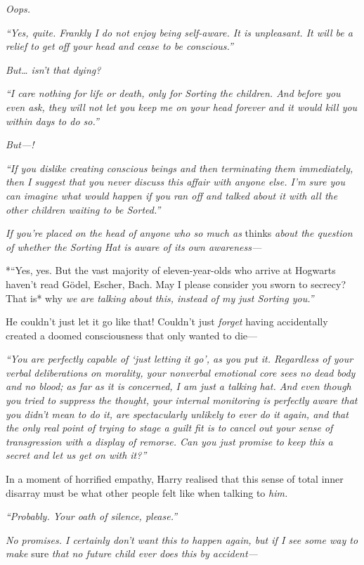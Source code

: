 \emph{Oops.}

\emph{``Yes, quite. Frankly I do not enjoy being self-aware. It is
unpleasant. It will be a relief to get off your head and cease to be
conscious.''}

\emph{But\ldots{} isn't that dying?}

\emph{``I care nothing for life or death, only for Sorting the children.
And before you even ask, they will not let you keep me on your head
forever and it would kill you within days to do so.''}

\emph{But---!}

\emph{``If you dislike creating conscious beings and then terminating
them immediately, then I suggest that you never discuss this affair with
anyone else. I'm sure you can imagine what would happen if you ran off
and talked about it with all the other children waiting to be Sorted.''}

\emph{If you're placed on the head of anyone who so much as} thinks
\emph{about the question of whether the Sorting Hat is aware of its own
awareness---}

*``Yes, yes. But the vast majority of eleven-year-olds who arrive at
Hogwarts haven't read Gödel, Escher, Bach. May I please consider you
sworn to secrecy? That is* why \emph{we are talking about this, instead
of my just Sorting you.''}

He couldn't just let it go like that! Couldn't just \emph{forget} having
accidentally created a doomed consciousness that only wanted to die---

\emph{``You are perfectly capable of `just letting it go', as you put
it. Regardless of your verbal deliberations on morality, your nonverbal
emotional core sees no dead body and no blood; as far as it is
concerned, I am just a talking hat. And even though you tried to
suppress the thought, your internal monitoring is perfectly aware that
you didn't mean to do it, are spectacularly unlikely to ever do it
again, and that the only real point of trying to stage a guilt fit is to
cancel out your sense of transgression with a display of remorse. Can
you just promise to keep this a secret and let us get on with it?''}

In a moment of horrified empathy, Harry realised that this sense of
total inner disarray must be what other people felt like when talking to
\emph{him.}

\emph{``Probably. Your oath of silence, please.''}

\emph{No promises. I certainly don't want this to happen again, but if I
see some way to make} sure \emph{that no future child ever does this by
accident---}


